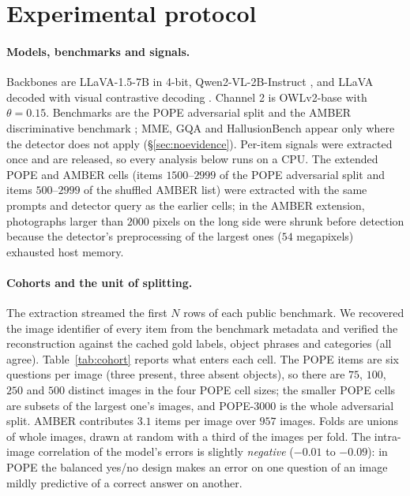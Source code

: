 \section{Experimental protocol}
\label{sec:protocol}

\paragraph{Models, benchmarks and signals.}
Backbones are LLaVA-1.5-7B \citep{llava} in 4-bit, Qwen2-VL-2B-Instruct \citep{qwenvl}, and LLaVA decoded with
visual contrastive decoding \citep{vcd}. Channel 2 is OWLv2-base \citep{owlv2} with $\theta=0.15$. Benchmarks are
the POPE adversarial split \citep{pope} and the AMBER discriminative benchmark \citep{amber}; MME, GQA and
HallusionBench appear only where the detector does not apply (\S\ref{sec:noevidence}). Per-item signals were
extracted once and are released, so every analysis below runs on a CPU. The extended POPE and AMBER cells (items $1500$--$2999$ of the
POPE adversarial split and items $500$--$2999$ of the shuffled AMBER list) were extracted with the same prompts and detector query as the
earlier cells; in the AMBER extension, photographs larger than $2000$ pixels on the long side were shrunk before detection because the
detector's preprocessing of the largest ones ($54$ megapixels) exhausted host memory.

\paragraph{Cohorts and the unit of splitting.}
The extraction streamed the first $N$ rows of each public benchmark. We recovered the image identifier of every
item from the benchmark metadata and verified the reconstruction against the cached gold labels, object phrases
and categories (all agree). Table~\ref{tab:cohort} reports what enters each cell. The POPE items are
six questions per image (three present, three absent objects), so there are $75$, $100$, $250$ and $500$ distinct
images in the four POPE cell sizes; the smaller POPE cells are subsets of the largest one's images, and POPE-3000 is the whole
adversarial split. AMBER contributes $3.1$ items per image over $957$ images. Folds are unions of whole images, drawn at
random with a third of the images per fold. The intra-image correlation of the model's errors is slightly \emph{negative}
($-0.01$ to $-0.09$): in POPE the balanced yes/no design makes an error on one question of an image mildly predictive of a
correct answer on another.

